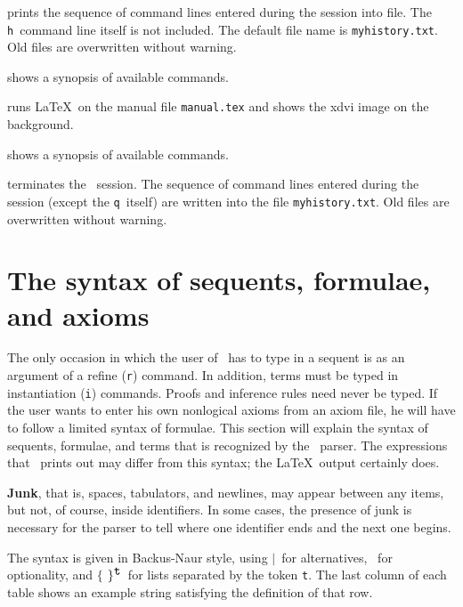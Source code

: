 prints the sequence of command lines entered during the session into file.
The {\tt h}\ command line itself is not included.
The default file name is {\tt myhistory.txt}. Old files are overwritten without 
warning.

shows a synopsis of available commands.

runs \LaTeX\ on the manual file {\tt manual.tex} and shows the xdvi image on the
background.

shows a synopsis of available commands.

terminates the \PESC\ session. 
The sequence of command lines entered during the session (except the 
{\tt q}\ itself) are written into the file {\tt myhistory.txt}.
Old files are overwritten without warning.



\newcommand{\kleene}[2]{$\{$ #1 $\}^{\mbox{\tt #2}}$}
\newcommand{\gives}{$\; ::= \; $}
\newcommand{\altern}{$\mid$}
\newcommand{\option}[1]{\sugmap{\mbox{#1}}}
\newcommand{\eg}{}%



\section{The syntax of sequents, formulae, and axioms}

The only occasion in which the user of \PESC\ has to type in a sequent is as
an argument of a refine ({\tt r}) command. In addition, terms must be typed
in instantiation ({\tt i}) commands. Proofs and inference rules need never be typed.
If the user wants to enter his own nonlogical axioms from an axiom file,
he will have to follow a limited syntax of formulae. This section will explain the
syntax of sequents, formulae, and terms that is recognized by the \PESC\ parser.
The expressions that \PESC\ prints out may differ from this syntax; the \LaTeX\
output certainly does.

{\bf Junk}, that is, spaces, tabulators, and newlines, may appear between
any items, but not, of course, inside identifiers. In some cases, the presence of
junk is necessary for the parser to tell where one identifier ends and the next 
one begins.

The syntax is given in Backus-Naur style, using \altern\ for alternatives,
\option{}\ for optionality, and \kleene{}{t}\ for lists separated by the token
{\tt t}. The last column of each table shows
an example string satisfying the definition of that row.



